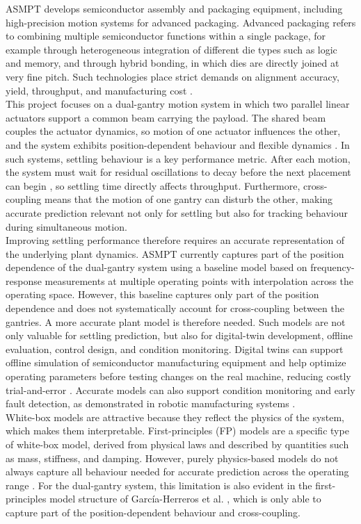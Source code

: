 ASMPT develops semiconductor assembly and packaging equipment, including high-precision motion systems for advanced packaging. Advanced packaging refers to combining multiple semiconductor functions within a single package, for example through heterogeneous integration of different die types such as logic and memory, and through hybrid bonding, in which dies are directly joined at very fine pitch. Such technologies place strict demands on alignment accuracy, yield, throughput, and manufacturing cost \cite{irds2022,workman2021diewafer}.
\\
This project focuses on a dual-gantry motion system in which two parallel linear actuators support a common beam carrying the payload. The shared beam couples the actuator dynamics, so motion of one actuator influences the other, and the system exhibits position-dependent behaviour and flexible dynamics \cite{garcia2013model, teo2007dynamic}. In such systems, settling behaviour is a key performance metric. After each motion, the system must wait for residual oscillations to decay before the next placement can begin \cite{lambrechts2005trajectory}, so settling time directly affects throughput. Furthermore, cross-coupling means that the motion of one gantry can disturb the other, making accurate prediction relevant not only for settling but also for tracking behaviour during simultaneous motion.
\\
Improving settling performance therefore requires an accurate representation of the underlying plant dynamics. ASMPT currently captures part of the position dependence of the dual-gantry system using a baseline model based on frequency-response measurements at multiple operating points with interpolation across the operating space. However, this baseline captures only part of the position dependence and does not systematically account for cross-coupling between the gantries. A more accurate plant model is therefore needed. Such models are not only valuable for settling prediction, but also for digital-twin development, offline evaluation, control design, and condition monitoring. Digital twins can support offline simulation of semiconductor manufacturing equipment and help optimize operating parameters before testing changes on the real machine, reducing costly trial-and-error \cite{hwang2024semiconductor}. Accurate models can also support condition monitoring and early fault detection, as demonstrated in robotic manufacturing systems \cite{aivaliotis2019predictive}.
\\
White-box models are attractive because they reflect the physics of the system, which makes them interpretable. First-principles (FP) models are a specific type of white-box model, derived from physical laws and described by quantities such as mass, stiffness, and damping. However, purely physics-based models do not always capture all behaviour needed for accurate prediction across the operating range \cite{willard2020integrating}. For the dual-gantry system, this limitation is also evident in the first-principles model structure of Garc\'ia-Herreros et al. \cite{garcia2013model}, which is only able to capture part of the position-dependent behaviour and cross-coupling.

